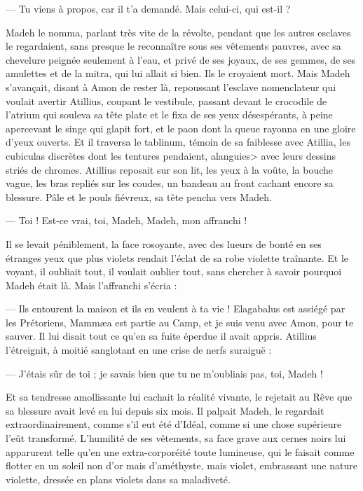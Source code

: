 \documentclass[a4paper, 11pt, oneside, polutonikogreek, french]{article}
\begin{document}
--- Tu viens à propos, car il t'a demandé. Mais celui-ci, qui est-il ?

Madeh le nomma, parlant très vite de la révolte, pendant que les autres esclaves le regardaient, sans presque le reconnaître sous ses vêtements pauvres, avec sa chevelure peignée seulement à l'eau, et privé de ses joyaux, de ses gemmes, de ses amulettes et de la mitra, qui lui allait si bien. Ils le croyaient mort. Mais Madeh s'avançait, disant à Amon de rester là, repoussant l'esclave nomenclateur qui voulait avertir Atillius, coupant le vestibule, passant devant le crocodile de l'atrium qui souleva sa tête plate et le fixa de ses yeux désespérants, à peine apercevant le singe qui glapit fort, et le paon dont la queue rayonna en une gloire d'yeux ouverts. Et il traversa le tablinum, témoin de sa faiblesse avec Atillia, les cubiculas discrètes dont les tentures pendaient, alanguies> avec leurs dessins striés de chromes. Atillius reposait sur son lit, les yeux à la voûte, la bouche vague, les bras repliés sur les coudes, un bandeau au front cachant encore sa blessure. Pâle et le pouls fiévreux, sa tête pencha vers Madeh.

--- Toi ! Est-ce vrai, toi, Madeh, Madeh, mon affranchi !

Il se levait péniblement, la face rosoyante, avec des lueurs de bonté en ses étranges yeux que plus violets rendait l'éclat de sa robe violette traînante. Et le voyant, il oubliait tout, il voulait oublier tout, sans chercher à savoir pourquoi Madeh était là. Mais l'affranchi s'écria :

--- Ils entourent la maison et ils en veulent à ta vie ! Elagabalus est assiégé par les Prétoriens, Mammæa est partie au Camp, et je suis venu avec Amon, pour te sauver. Il lui disait tout ce qu'en sa fuite éperdue il avait appris. Atillius l'étreignit, à moitié sanglotant en une crise de nerfs suraiguë :

--- J'étais sûr de toi ; je savais bien que tu ne m'oubliais pas, toi, Madeh !

Et sa tendresse amollissante lui cachait la réalité vivante, le rejetait au Rêve que sa blessure avait levé en lui depuis six mois. Il palpait Madeh, le regardait extraordinairement, comme s'il eut été d'Idéal, comme si une chose supérieure l'eût transformé. L'humilité de ses vêtements, sa face grave aux cernes noirs lui apparurent telle qu'en une extra-corporéité toute lumineuse, qui le faisait comme flotter en un soleil non d'or mais d'améthyste, mais violet, embrassant une nature violette, dressée en plans violets dans sa maladiveté.
\end{document}
